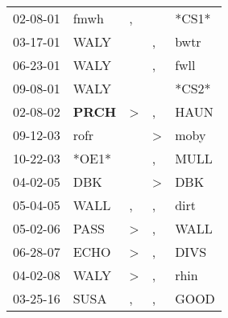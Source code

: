 \begin{supertabular}{p{0.07\textwidth}p{0.06\textwidth}p{0.02\textwidth}p{0.02\textwidth}p{0.06\textwidth}}
 02-08-01\textsuperscript{} &           fmwh\textsuperscript{} &             , &               &                   *CS1* \\
 03-17-01\textsuperscript{} &           WALY\textsuperscript{} &               &             , &  bwtr\textsuperscript{} \\
 06-23-01\textsuperscript{} &           WALY\textsuperscript{} &               &             , &  fwll\textsuperscript{} \\
 09-08-01\textsuperscript{} &           WALY\textsuperscript{} &               &               &                   *CS2* \\
 02-08-02\textsuperscript{} &  \textbf{PRCH\textsuperscript{}} &  \textgreater &             , &  HAUN\textsuperscript{} \\
 09-12-03\textsuperscript{} &           rofr\textsuperscript{} &               &  \textgreater &  moby\textsuperscript{} \\
 10-22-03\textsuperscript{} &                            *OE1* &               &             , &  MULL\textsuperscript{} \\
 04-02-05\textsuperscript{} &            DBK\textsuperscript{} &               &  \textgreater &   DBK\textsuperscript{} \\
 05-04-05\textsuperscript{} &           WALL\textsuperscript{} &             , &             , &  dirt\textsuperscript{} \\
 05-02-06\textsuperscript{} &           PASS\textsuperscript{} &  \textgreater &             , &  WALL\textsuperscript{} \\
 06-28-07\textsuperscript{} &           ECHO\textsuperscript{} &  \textgreater &             , &  DIVS\textsuperscript{} \\
 04-02-08\textsuperscript{} &           WALY\textsuperscript{} &  \textgreater &             , &  rhin\textsuperscript{} \\
 03-25-16\textsuperscript{} &           SUSA\textsuperscript{} &             , &             , &  GOOD\textsuperscript{} \\
\end{supertabular}
